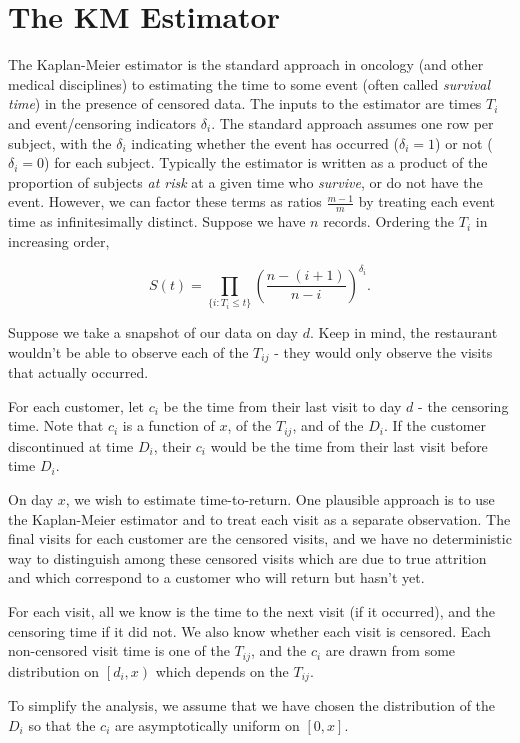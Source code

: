 \documentclass[11pt]{article}
\theoremstyle{definition}
\begin{document}
\section{The KM Estimator}

The Kaplan-Meier estimator is the standard approach in oncology (and other medical disciplines) to estimating the time
to some event (often called \textit{survival time}) in the presence of censored data.  The inputs to the estimator are times
$T_i$ and event/censoring indicators $\delta_i$.  The standard approach assumes one row per subject, with
the $\delta_i$ indicating whether the event has occurred ($\delta_i=1$) or not ($\delta_i=0$) for each subject.  Typically
the estimator is written as a product of the proportion of subjects \textit{at risk} at a given time who \textit{survive}, or 
do not have the event.  However, we can factor these terms as ratios $\frac{m-1}{m}$ by treating each event time 
as infinitesimally distinct.  Suppose we have $n$ records.  Ordering the $T_i$ in increasing order, 

\[S(t)=\prod_{\{i:T_i\le t\}} \left(\frac{n-(i+1)}{n-i}\right)^{\delta_i}.\]

Suppose we take a snapshot of our data on day $d$.  Keep in mind, the restaurant wouldn't be able to observe
each of the $T_{ij}$ - they would only observe the visits that actually occurred.

For each customer, let $c_i$ be the time from their last visit to day $d$ - the censoring time.  Note that
$c_i$ is a function of $x$, of the $T_{ij}$, and of the $D_i$.  If the customer discontinued at time $D_i$,
their $c_i$ would be the time from their last visit before time $D_i$. 

On day $x$, we wish to estimate time-to-return.  One plausible approach is to use the Kaplan-Meier
estimator and to treat each visit as a separate observation.  The final visits for each customer are the censored
visits, and we have no deterministic way to distinguish among these censored visits which are due to true attrition
and which correspond to a customer who will return but hasn't yet.

For each visit, all we know is the time to the next visit (if it occurred), and the censoring time if it 
did not.  We also know whether each visit is censored.  Each non-censored visit time is one of the $T_{ij}$,
and the $c_i$ are drawn from some distribution on $\left[d_i,x\right)$ which depends on the $T_{ij}$.  

To simplify the analysis, we assume that we have chosen the distribution of the $D_i$ so that the $c_i$
are asymptotically uniform on $\left[0,x\right]$.
\end{document}
